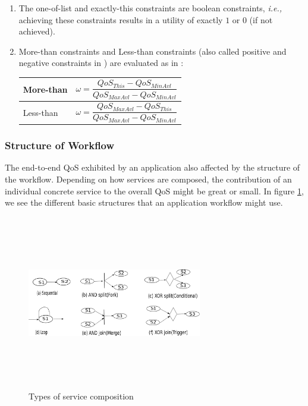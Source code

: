 \documentclass[10pt,journal,compsoc]{IEEEtran}
\begin{document}
\begin{enumerate}
\item The one-of-list and exactly-this constraints are boolean constraints, \textit{i.e.,} achieving these constraints results in a utility of exactly $1$ or $0$ (if not achieved). 
\item More-than constraints and Less-than constraints (also called positive and negative constraints in \cite{Ardagna2007Adaptive}) are evaluated as in \cite{Ardagna2007Adaptive}: 
\hspace{1cm}
\begin{table}[h]
\begin{tabular}{|p{1cm}p{5cm}|}
\hline
More-than & \[ \omega = \frac{QoS_{This} - QoS_{MinAvl}}{QoS_{MaxAvl} - QoS_{MinAvl}} \] \\
\hline
Less-than & \[ \omega = \frac{QoS_{MaxAvl} - QoS_{This}}{QoS_{MaxAvl} - QoS_{MinAvl}} \] \\
\hline
\end{tabular}
\end{table}
\end{enumerate}

\subsubsection{Structure of Workflow}
The end-to-end QoS exhibited by an application also affected by the structure of the workflow. Depending on how services are composed, the contribution of an individual concrete service to the overall QoS might be great or small. In figure \ref{composition_types}, we see the different basic structures that an application workflow might use. 

 \begin{figure}
     \centering
     \includegraphics[width=3in, height=3in]{drawings/composition_types.png}
   \caption{Types of service composition}
  \label{composition_types}
  \end{figure}
\end{document}
